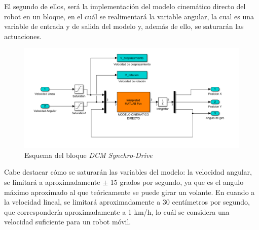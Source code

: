 \documentclass[a4paper,twoside]{article}
\begin{document}
 El segundo de ellos, será la implementación del modelo cinemático directo del robot en un bloque, en el cuál se realimentará la variable angular, la cual es una variable de entrada y de salida del modelo y, además de ello, se saturarán las actuaciones.
 \begin{figure}[h!]
	 \centering
	 \includegraphics[width=.65\textwidth]{simulink_MCD_3}
	 \caption{Esquema del bloque \textit{DCM Synchro-Drive}}
 \end{figure}

Cabe destacar cómo se saturarán las variables del modelo: la velocidad angular, se limitará a aproximadamente $\pm$ 15 grados por segundo, ya que es el angulo máximo aproximado al que teóricamente se puede girar un volante. En cuando a la velocidad lineal, se limitará aproximadamente a 30 centímetros por segundo, que correspondería aproximadamente a 1 km/h, lo cuál se considera una velocidad suficiente para un robot móvil.\\
\end{document}
